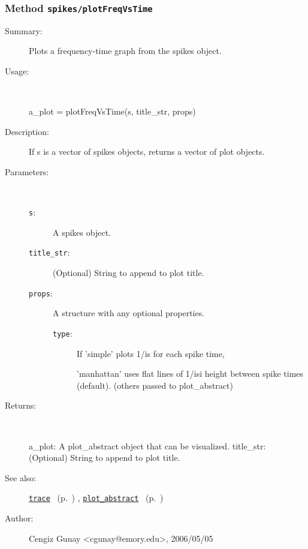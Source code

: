 \subsubsection[Method \texttt{plotFreqVsTime}]{Method \texttt{spikes/plotFreqVsTime}}%
%
\label{ref_spikes__plotFreqVsTime}%
\hypertarget{ref_spikes__plotFreqVsTime}{}%
\begin{description}
\item[Summary:]Plots a frequency-time graph from the spikes object.
%
\item[Usage:]~%
\begin{lyxcode}%
a\_plot = plotFreqVsTime(s, title\_str, props)
%
\end{lyxcode}%
%
\item[Description:]%
If s is a vector of spikes objects, returns a vector of plot objects.
\item[Parameters:]~
\begin{description}%
\item[\texttt{s}:]
 A spikes object.
\item[\texttt{title\_str}:]
 (Optional) String to append to plot title.
\item[\texttt{props}:]
 A structure with any optional properties.
\begin{description}%
\item[\texttt{type}:]
 If 'simple' plots 1/is for each spike time, 

'manhattan' uses flat lines of 1/isi height between spike times (default).
(others passed to plot\_abstract)\end{description}%
\end{description}%
%
\item[Returns:]~

	a\_plot: A plot\_abstract object that can be visualized.
	title\_str: (Optional) String to append to plot title.
%
%
\item[See also:]%
\hyperlink{ref_trace}{\texttt{trace}}%
\ (p.~\pageref{ref_trace})%
%
, \hyperlink{ref_plot_abstract}{\texttt{plot\_abstract}}%
\ (p.~\pageref{ref_plot_abstract})%
%
%
\item[Author:]%
Cengiz Gunay <cgunay@emory.edu>, 2006/05/05%
\end{description}
\methodline%
